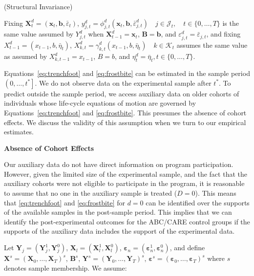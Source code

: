 \begin{assumption}\label{ass:butts}
(Structural Invariance)\\
\begin{spacing}{1.5}
\noindent Fixing $\bm{X}^d_t = (\bm{x}_t, \bm{b},\bar{\varepsilon}_t)$, $y^d_{j,t} = \phi^d_{j,t} (\bm{x}_t, \bm{b},  \bar{\varepsilon}^d_{j,t}) \quad j \in \mathcal{J}_t, \quad t \in \{0,\ldots,T\}$ is the same value assumed by $Y^d_{j,t}$ when $\bm{X}^d_{t-1} = \bm{x}_t$, $\bm{B} = \bm{b}$, and $\varepsilon^d_{j,t} = \bar{\varepsilon}_{j,t}$, and fixing $X^d_{t-1} = (x_{t-1}, b, \bar{\eta}_t)$, $X^d_{k,t} = \gamma^d_{k,t} (x_{t-1}, b, \bar{\eta}_t) \quad k \in \mathcal{K}_t$ assumes the same value as assumed by $X^d_{k,t-1} = x_{t-1}$, $B = b$, and $\eta^d_t = \bar{\eta}_t, t \in \{0,\dots,T\}$.
\end{spacing}
\end{assumption}

Equations~\eqref{eq:trenchfoot} and \eqref{eq:frostbite} can be estimated in the sample period $\left(0,\ldots,t^{*}\right]$. We do not observe data on the experimental sample after $t^{*}$. To predict outside the sample period, we access auxiliary data on older cohorts of individuals whose life-cycle equations of motion are governed by Equations~\eqref{eq:trenchfoot} and \eqref{eq:frostbite}. This presumes the absence of cohort effects. We discuss the validity of this assumption when we turn to our empirical estimates.

\begin{assumption}\label{ass:crotchrot}
\textbf{Absence of Cohort Effects}
\end{assumption}

Our auxiliary data do not have direct information on program participation. However, given the limited size of the experimental sample, and the fact that the auxiliary cohorts were not eligible to participate in the program, it is reasonable to assume that no one in the auxiliary sample is treated ($D=0$). This means that \eqref{eq:trenchfoot} and \eqref{eq:frostbite} for $d=0$ can be identified over the supports of the available samples in the post-sample period. This implies that we can identify the post-experimental outcomes for the ABC/CARE control groups if the supports of the auxiliary data includes the support of the experimental data.

Let $\bm{Y}_j = (\bm{Y}^1_j, \bm{Y}^0_j)$, $\bm{X}_l = (\bm{X}^1_l, \bm{X}^0_l)$, $\bm{\varepsilon}_n = (\bm{\varepsilon}^1_n, \bm{\varepsilon}^0_n)$, and define $\bm{X}^s = (\bm{X}_0,\dots,\bm{X}_T)^s$, $\bm{B}^s$, $\bm{Y}^s = (\bm{Y}_0,\dots,\bm{Y}_T)^s$, $\bm{\varepsilon}^s = (\bm{\varepsilon}_0,\dots,\bm{\varepsilon}_{T})^s$ where $s$ denotes sample membership. We assume:

